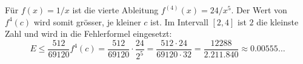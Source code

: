 Für $f(x) = 1/x$ ist die vierte Ableitung $f^{(4)}(x) = 24/x^{5}$. 
Der Wert von $f^{4}(c)$ wird somit grösser, je kleiner $c$ ist.
Im Intervall $[2,4]$ ist $2$ die kleinste Zahl und wird in die Fehlerformel eingesetzt:
\begin{equation}
    E \leq \frac{512}{69120}f^{4}(c) = \frac{512}{69120} \cdot \frac{24}{2^{5}} = \frac{512 \cdot 24}{69120 \cdot 32} = \frac{12288}{2.211.840}\approx 0.00555\dots
\end{equation}



